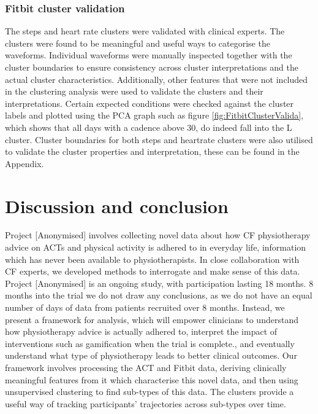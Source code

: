 \documentclass{article}
\begin{document}
\subsubsection{Fitbit cluster validation }

The steps and heart rate clusters were validated with clinical experts. The clusters were found to be meaningful and useful ways to categorise the waveforms. Individual waveforms were manually inspected together with the cluster boundaries to ensure consistency across cluster interpretations and the actual cluster characteristics. Additionally, other features that were not included in the clustering analysis were used to validate the clusters and their interpretations. Certain expected conditions were checked against the cluster labels and plotted using the PCA graph such as figure \ref{fig:FitbitClusterValida}, which shows that all days with a cadence above 30, do indeed fall into the L cluster. Cluster boundaries for both steps and heartrate clusters were also utilised to validate the cluster properties and interpretation, these can be found in the Appendix. 

\section{Discussion and conclusion} 

Project [Anonymised] involves collecting novel data about how CF physiotherapy advice on ACTs and physical activity is adhered to in everyday life, information which has never been available to physiotherapists. In close collaboration with CF experts, we developed methods to interrogate and make sense of this data. Project [Anonymised] is an ongoing study, with participation lasting 18 months. 8 months into the trial we do not draw any conclusions, as we do not have an equal number of days of data from patients recruited over 8 months. Instead, we present a framework for analysis, which will empower clinicians to understand how physiotherapy advice is actually adhered to, interpret the impact of interventions such as gamification when the trial is complete., and eventually understand what type of physiotherapy leads to better clinical outcomes. Our framework involves processing the ACT and Fitbit data, deriving clinically meaningful features from it which characterise this novel data, and then using unsupervised clustering to find sub-types of this data. The clusters provide a useful way of tracking participants' trajectories across sub-types over time. 
\end{document}
